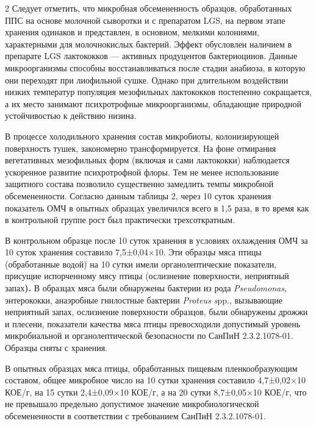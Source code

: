 \begin{multicols}{2}
Следует отметить, что микробная обсемененность образцов, обработанных
ППС на основе молочной сыворотки и с препаратом LGS, на первом этапе
хранения одинаков и представлен, в основном, мелкими колониями,
характерными для молочнокислых бактерий. Эффект обусловлен наличием в
препарате LGS лактококков --- активных продуцентов бактериоцинов. Данные
микроорганизмы способны восстанавливаться после стадии анабиоза, в
которую они переходят при лиофильной сушке. Однако при длительном
воздействии низких температур популяция мезофильных лактококков
постепенно сокращается, а их место занимают психротрофные
микроорганизмы, обладающие природной устойчивостью к действию низина.

В процессе холодильного хранения состав микробиоты, колонизирующей
поверхность тушек, закономерно трансформируется. На фоне отмирания
вегетативных мезофильных форм (включая и сами лактококки) наблюдается
ускоренное развитие психротрофной флоры. Тем не менее использование
защитного состава позволило существенно замедлить темпы микробной
обсемененности. Согласно данным таблицы 2, через 10 суток хранения
показатель ОМЧ в опытных образцах увеличился всего в 1,5 раза, в то
время как в контрольной группе рост был практически трехсоткратным.

В контрольном образце после 10 суток хранения в условиях охлаждения ОМЧ
за 10 суток хранения составило 7,5±0,04×10. Эти
образцы мяса птицы (обработанные водой) на 10 сутки имели
органолептические показатели, присущие испорченному мясу птицы
(ослизнение поверхности, неприятный запах{\bfseries ).} В образцах мяса
были обнаружены бактерии из рода \emph{Pseudomonas,} энтерококки,
анаэробные гнилостные бактерии \emph{Proteus s}pp., вызывающие
неприятный запах, ослизнение поверхности образцов, были обнаружены
дрожжи и плесени, показатели качества мяса птицы превосходили допустимый
уровень микробиальной и органолептической безопасности по СанПиН
2.3.2.1078-01. Образцы сняты с хранения.

В опытных образцах мяса птицы, обработанных пищевым пленкообразующим
составом, общее микробное число на 10 сутки хранения составило
4,7±0,02×10 КОЕ/г, на 15 сутки
2,4±0,09×10 КОЕ/г, а на 20 сутки
8,7±0,05×10 КОЕ/г, что не превышало предельно
допустимое значение микробиологической обсемененности в соответствии с
требованием СанПиН 2.3.2.1078-01.


\end{multicols}
